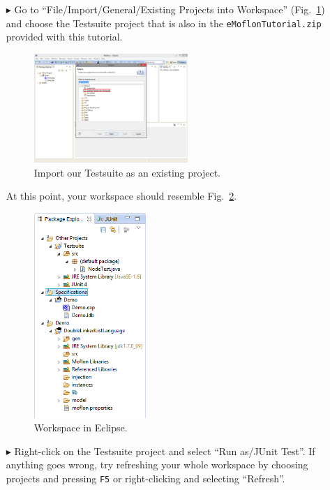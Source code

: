 \begin{enumerate}
\item[$\blacktriangleright$] Go to ``File/Import/General/Existing Projects into Workspace'' (Fig.~\ref{fig_eclipseTestsuiteImport}) and choose the Testsuite project that is also in the \texttt{eMoflonTutorial.zip} provided with this tutorial. 
\begin{figure}[htbp]
	\centering
  \includegraphics[width=0.55\textwidth]{pics/installationAndSetup/eclipse_testsuitimport.png}
	\caption{Import our Testsuite as an existing project.}
	\label{fig_eclipseTestsuiteImport}
\end{figure} 

\item[] At this point, your workspace should resemble Fig.~\ref{fig_eclipsepackageexplorer}.
\begin{figure}[htbp]
	\centering
  \includegraphics[width=0.4\textwidth]{pics/installationAndSetup/eclipse_packageexplorer.png}
	\caption{Workspace in Eclipse.}
	\label{fig_eclipsepackageexplorer}
\end{figure}

\item[$\blacktriangleright$] Right-click on the Testsuite project and select ``Run as/JUnit Test''.
If anything goes wrong, try refreshing your whole workspace by choosing projects and pressing \texttt{F5} or right-clicking and selecting ``Refresh''.


\end{enumerate}
